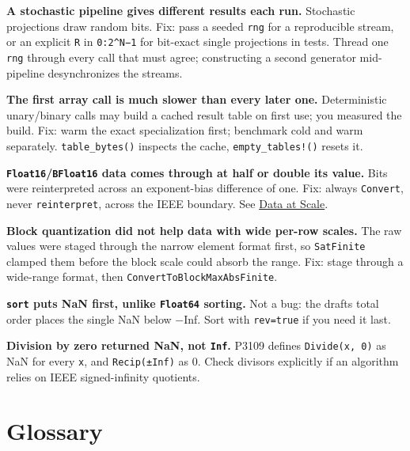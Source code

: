 \textbf{A stochastic pipeline gives different results each run.} Stochastic projections draw random bits. Fix: pass a seeded \texttt{rng} for a reproducible stream, or an explicit \texttt{R} in \texttt{0:2{\textasciicircum}N−1} for bit-exact single projections in tests. Thread one \texttt{rng} through every call that must agree; constructing a second generator mid-pipeline desynchronizes the streams.



\textbf{The first array call is much slower than every later one.} Deterministic unary/binary calls may build a cached result table on first use; you measured the build. Fix: warm the exact specialization first; benchmark cold and warm separately. \texttt{table\_\allowbreak{}bytes()} inspects the cache, \texttt{empty\_\allowbreak{}tables!()} resets it.



\textbf{\texttt{Float16}/\allowbreak\texttt{BFloat16} data comes through at half or double its value.} Bits were reinterpreted across an exponent-bias difference of one. Fix: always \texttt{Convert}, never \texttt{reinterpret}, across the IEEE boundary. See \href{data.md}{Data at Scale}.



\textbf{Block quantization did not help data with wide per-row scales.} The raw values were staged through the narrow element format first, so \texttt{SatFinite} clamped them before the block scale could absorb the range. Fix: stage through a wide-range format, then \texttt{ConvertToBlockMaxAbsFinite}.



\textbf{\texttt{sort} puts NaN first, unlike \texttt{Float64} sorting.} Not a bug: the draft{\textquotesingle}s total order places the single NaN below −Inf. Sort with \texttt{rev=true} if you need it last.



\textbf{Division by zero returned NaN, not \texttt{Inf}.} P3109 defines \texttt{Divide(x, 0)} as NaN for every \texttt{x}, and \texttt{Recip(±Inf)} as 0. Check divisors explicitly if an algorithm relies on IEEE signed-infinity quotients.





\chapter{Glossary}



\label{5283940344096028924}{}


